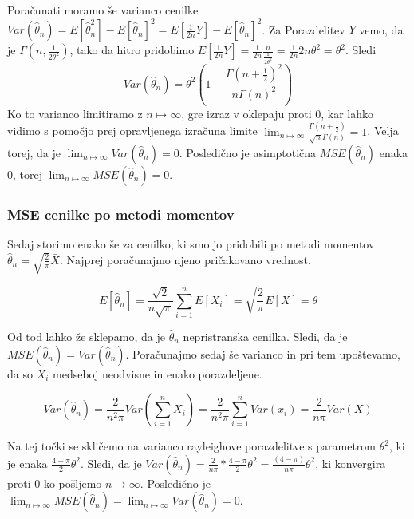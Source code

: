\documentclass[a4paper, 10pt]{article}
\begin{document}
	Poračunati moramo še varianco cenilke $Var(\widehat{\theta}_n) = E[\widehat{\theta}_n^2] - E[\widehat{\theta}_n]^2 = E[\frac{1}{2n} Y] - E[\widehat{\theta}_n]^2$. Za Porazdelitev $Y$ vemo, da je $\Gamma(n, \frac{1}{2\theta^2})$, tako da hitro pridobimo $E[\frac{1}{2n} Y] = \frac{1}{2n}\frac{n}{\frac{1}{2\theta^2}} = \frac{1}{2n}2n\theta^2 = \theta^2$. Sledi $$Var(\widehat{\theta}_n) = \theta^2(1 - \frac{\Gamma(n + \frac{1}{2})^2}{n\Gamma(n)^2})$$
	Ko to varianco limitiramo z $n\mapsto\infty$, gre izraz v oklepaju proti $0$, kar lahko vidimo s pomočjo prej opravljenega izračuna limite $\lim_{n\mapsto\infty} \frac{\Gamma(n + \frac{1}{2})}{\sqrt{n}\Gamma(n)} = 1$. Velja torej, da je $\lim_{n\mapsto\infty}Var(\widehat{\theta}_n) = 0$. Posledično je asimptotična $MSE(\widehat{\theta}_n)$ enaka $0$, torej $\lim_{n\mapsto\infty}MSE(\widehat{\theta}_n) = 0$.
	
	\subsubsection{MSE cenilke po metodi momentov}\label{subsubsect: 2C2}
	Sedaj storimo enako še za cenilko, ki smo jo pridobili po metodi momentov $\widehat{\theta}_n = \sqrt{\frac{2}{\pi}}\bar{X}$. Najprej poračunajmo njeno pričakovano vrednost.
	
	\begin{equation*}		
		E[\widehat{\theta}_n] = \frac{\sqrt{2}}{n\sqrt{\pi}} \sum_{i=1}^{n} E[X_i] = \sqrt{\frac{2}{\pi}} E[X] = \theta
	\end{equation*}
	
	Od tod lahko že sklepamo, da je $\widehat{\theta}_n$ nepristranska cenilka. Sledi, da je $MSE(\widehat{\theta}_n) = Var(\widehat{\theta}_n)$. Poračunajmo sedaj še varianco in pri tem upoštevamo, da so $X_i$ medseboj neodvisne in enako porazdeljene.
	
	\begin{equation*}		
		Var(\widehat{\theta}_n) = \frac{2}{n^2\pi}Var(\sum_{i = 1}^{n}X_i) = \frac{2}{n^2 \pi} \sum_{i = 1}^{n}Var(x_i) = \frac{2}{n \pi} Var(X)
	\end{equation*}
	
	Na tej točki se skličemo na varianco rayleighove porazdelitve s parametrom $\theta^2$, ki je enaka $\frac{4 - \pi}{2}\theta^2$. Sledi, da je $Var(\widehat{\theta}_n) = \frac{2}{n\pi} * \frac{4 - \pi}{2}\theta^2 = \frac{(4-\pi)}{n\pi}\theta^2$, ki konvergira proti $0$ ko pošljemo $n\mapsto\infty$. Posledično je $\lim_{n\mapsto\infty}MSE(\widehat{\theta}_n) = \lim_{n\mapsto\infty} Var(\widehat{\theta}_n) =0$.
	
\end{document}
